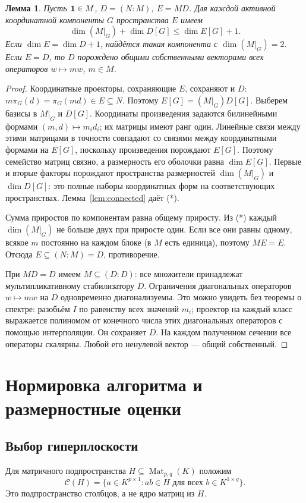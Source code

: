 \documentclass[11pt,a4paper]{article}
\numberwithin{equation}{section}
\theoremstyle{plain}
\newtheorem{lemma}[theorem]{Лемма}
\theoremstyle{definition}
\DeclareMathOperator{\Mat}{Mat}\DeclareMathOperator{\Span}{span}
\newcommand{\col}{\mathcal C}\newcommand{\test}{\mathcal T}
\newcommand{\leqs}{\leqslant}\newcommand{\geqs}{\geqslant}
\begin{document}
\begin{lemma}\label{lem:component-cost}
Пусть $\mathbf1\in M$, $D=(N:M)$, $E=MD$. Для каждой активной координатной
компоненты $G$ пространства $E$ имеем
\[
 \dim(M|_G)+\dim D[G]\leqs\dim E[G]+1.                 \tag{*}
\]
Если $\dim E=\dim D+1$, найдётся такая компонента с $\dim(M|_G)=2$.
Если $E=D$, то $D$ порождено общими собственными векторами всех
операторов $w\mapsto mw$, $m\in M$.
\end{lemma}
\begin{proof}
Координатные проекторы, сохраняющие $E$, сохраняют и $D$:
$m\pi_G(d)=\pi_G(md)\in E\subseteq N$. Поэтому
$E[G]=(M|_G)D[G]$. Выберем базисы в $M|_G$ и $D[G]$.
Координаты произведения задаются билинейными формами
$(m,d)\mapsto m_i d_i$; их матрицы имеют ранг один.
Линейные связи между этими матрицами в точности совпадают со связями
между координатными формами на $E[G]$, поскольку произведения
порождают $E[G]$. Поэтому семейство матриц связно, а размерность его
оболочки равна $\dim E[G]$. Первые и вторые факторы порождают
пространства размерностей $\dim(M|_G)$ и $\dim D[G]$: это полные
наборы координатных форм на соответствующих пространствах.
Лемма~\ref{lem:connected} даёт (*).

Сумма приростов по компонентам равна общему приросту. Из (*) каждый
$\dim(M|_G)$ не больше двух при приросте один. Если все они равны одному,
всякое $m$ постоянно на каждом блоке (в $M$ есть единица), поэтому
$ME=E$. Отсюда $E\subseteq(N:M)=D$, противоречие.

При $MD=D$ имеем $M\subseteq(D:D)$: все множители принадлежат
мультипликативному стабилизатору $D$.
Ограничения диагональных операторов $w\mapsto mw$ на $D$
одновременно диагонализуемы. Это можно увидеть без теоремы о спектре:
разобьём $I$ по равенству всех значений $m_i$; проектор на каждый класс
выражается полиномом от конечного числа этих диагональных операторов
с помощью интерполяции. Он сохраняет $D$. На каждом полученном сечении
все операторы скалярны. Любой его ненулевой вектор --- общий собственный.
\end{proof}

\section{Нормировка алгоритма и размерностные оценки}

\subsection{Выбор гиперплоскости}
Для матричного подпространства $H\subseteq\Mat_{p,q}(K)$ положим
\[
 \col(H)=\{a\in K^{p\times1}:ab\in H
                 \text{ для всех }b\in K^{1\times q}\}.
\]
Это подпространство столбцов, а не ядро матриц из $H$.
\end{document}
